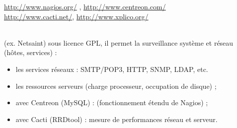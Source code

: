 \documentclass[a4paper,11pt]{article}				    %
\begin{document}
{
\url{http://www.nagios.org/} , \url{http://www.centreon.com/}\\
\url{http://www.cacti.net/}, \url{http://www.xplico.org/}
}
{
\\(ex. Netsaint) sous licence GPL, il permet la surveillance syst\`eme et r\'eseau (h\^otes, services) :
\small
\begin{itemize}
	\item les services r\'eseaux : SMTP/POP3, HTTP, SNMP, LDAP, etc.
	\item les ressources serveurs (charge processeur, occupation de disque) ;
	\item avec Centreon (MySQL) : (fonctionnement \'etendu de Nagios) ;
	\item avec Cacti (RRDtool) : mesure de performances r\'eseau et serveur.
\end{itemize}
}
\end{document}
